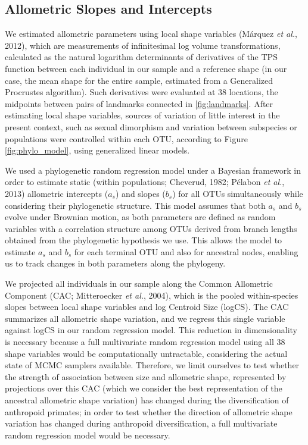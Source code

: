 \documentclass[12pt,]{article}
\begin{document}
\subsection{Allometric Slopes and
Intercepts}\label{allometric-slopes-and-intercepts}

We estimated allometric parameters using local shape variables (Márquez
\emph{et al.}, 2012), which are measurements of infinitesimal log volume
transformations, calculated as the natural logarithm determinants of
derivatives of the TPS function between each individual in our sample
and a reference shape (in our case, the mean shape for the entire
sample, estimated from a Generalized Procrustes algorithm). Such
derivatives were evaluated at 38 locations, the midpoints between pairs
of landmarks connected in \autoref{fig:landmarks}. After estimating
local shape variables, sources of variation of little interest in the
present context, such as sexual dimorphism and variation between
subspecies or populations were controlled within each OTU, according to
Figure \ref{fig:phylo_model}, using generalized linear models.

We used a phylogenetic random regression model under a Bayesian
framework in order to estimate static (within populations; Cheverud,
1982; Pélabon \emph{et al.}, 2013) allometric intercepts ($a_s$) and
slopes ($b_s$) for all OTUs simultaneously while considering their
phylogenetic structure. This model assumes that both $a_s$ and $b_s$
evolve under Brownian motion, as both parameters are defined as random
variables with a correlation structure among OTUs derived from branch
lengths obtained from the phylogenetic hypothesis we use. This allows
the model to estimate $a_s$ and $b_s$ for each terminal OTU and also for
ancestral nodes, enabling us to track changes in both parameters along
the phylogeny.

We projected all individuals in our sample along the Common Allometric
Component (CAC; Mitteroecker \emph{et al.}, 2004), which is the pooled
within-species slopes between local shape variables and log Centroid
Size (logCS). The CAC summarizes all allometric shape variation, and we
regress this single variable against logCS in our random regression
model. This reduction in dimensionality is necessary because a full
multivariate random regression model using all 38 shape variables would
be computationally untractable, considering the actual state of MCMC
samplers available. Therefore, we limit ourselves to test whether the
strength of association between size and allometric shape, represented
by projections over this CAC (which we consider the best representation
of the ancestral allometric shape variation) has changed during the
diversification of anthropoid primates; in order to test whether the
direction of allometric shape variation has changed during anthropoid
diversification, a full multivariate random regression model would be
necessary.
\end{document}
